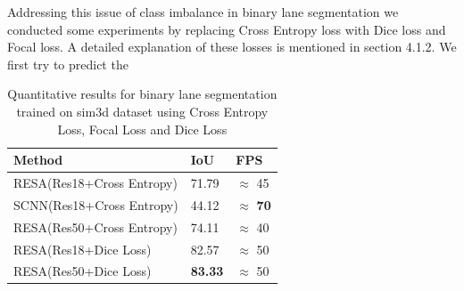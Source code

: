     Addressing this issue of class imbalance in binary lane segmentation we conducted some experiments by replacing Cross Entropy loss with Dice loss and Focal loss. A detailed explanation of these losses is mentioned in section 4.1.2. We first try to predict the 
    
     \begin{table}[h!]
    \caption{Quantitative results for binary lane segmentation trained on sim3d \cite{guo2020gen} dataset using Cross Entropy Loss, Focal Loss and Dice Loss}
    \centering
    \begin{tabular}{|l|l|l|}
    \hline
        \textbf{Method} & \textbf{IoU} & \textbf{FPS} \\ \hline
        RESA(Res18+Cross Entropy) & 71.79 & $\approx$ 45 \\ \hline
        SCNN(Res18+Cross Entropy) & 44.12 & $\approx$ \textbf{70}  \\ \hline
        RESA(Res50+Cross Entropy) & 74.11 & $\approx$ 40  \\ \hline

        RESA(Res18+Dice Loss) & 82.57 & $\approx$ 50 \\\hline
        RESA(Res50+Dice Loss) & \textbf{83.33} & $\approx$ 50 \\\hline
    \end{tabular}
\end{table}
    
